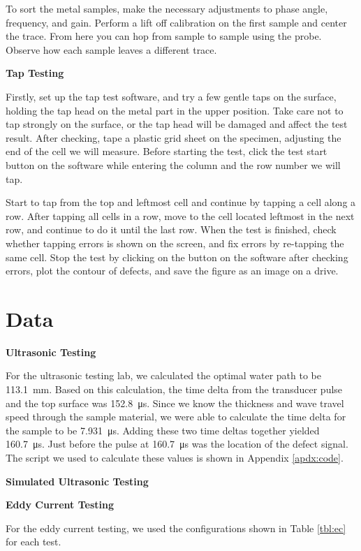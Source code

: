 \documentclass[12 pt]{report}
\begin{document}
To sort the metal samples, make the necessary adjustments to phase angle, frequency, and gain. Perform a lift off calibration on the first sample and center the trace. From here you can hop from sample to sample using the probe. Observe how each sample leaves a different trace.

\textbf{Tap Testing}

Firstly, set up the tap test software, and try a few gentle taps on the surface, holding the tap head on the metal part in the upper position. Take care not to tap strongly on the surface, or the tap head will be damaged and affect the test result. After checking, tape a plastic grid sheet on the specimen, adjusting the end of the cell we will measure. Before starting the test, click the test start button on the software while entering the column and the row number we will tap.

Start to tap from the top and leftmost cell and continue by tapping a cell along a row. After tapping all cells in a row, move to the cell located leftmost in the next row, and continue to do it until the last row. When the test is finished, check whether tapping errors is shown on the screen, and fix errors by re-tapping the same cell. Stop the test by clicking on the button on the software after checking errors, plot the contour of defects, and save the figure as an image on a drive.   

\section{Data} \label{data}
\textbf{Ultrasonic Testing}

For the ultrasonic testing lab, we calculated the optimal water path to be \qty{113.1}{\mm}. Based on this calculation, the time delta from the transducer pulse and the top surface was \qty{152.8}{\micro\second}. Since we know the thickness and wave travel speed through the sample material, we were able to calculate the time delta for the sample to be \qty{7.931}{\micro\second}. Adding these two time deltas together yielded \qty{160.7}{\micro\second}. Just before the pulse at \qty{160.7}{\micro\second} was the location of the defect signal. The script we used to calculate these values is shown in Appendix \ref{apdx:code}.

\textbf{Simulated Ultrasonic Testing}



\textbf{Eddy Current Testing}

For the eddy current testing, we used the configurations shown in Table \ref{tbl:ec} for each test.
\end{document}
